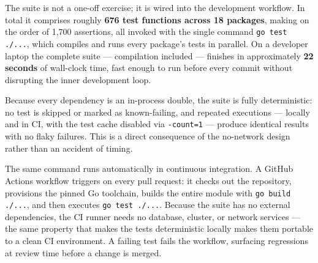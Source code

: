 The suite is not a one-off exercise; it is wired into the development workflow. In total it comprises roughly \textbf{676 test functions across 18 packages}, making on the order of 1{,}700 assertions, all invoked with the single command \texttt{go test ./...}, which compiles and runs every package's tests in parallel. On a developer laptop the complete suite --- compilation included --- finishes in approximately \textbf{22 seconds} of wall-clock time, fast enough to run before every commit without disrupting the inner development loop.

Because every dependency is an in-process double, the suite is fully deterministic: no test is skipped or marked as known-failing, and repeated executions --- locally and in CI, with the test cache disabled via \texttt{-count=1} --- produce identical results with no flaky failures. This is a direct consequence of the no-network design rather than an accident of timing.

The same command runs automatically in continuous integration. A GitHub Actions workflow triggers on every pull request: it checks out the repository, provisions the pinned Go toolchain, builds the entire module with \texttt{go build ./...}, and then executes \texttt{go test ./...}. Because the suite has no external dependencies, the CI runner needs no database, cluster, or network services --- the same property that makes the tests deterministic locally makes them portable to a clean CI environment. A failing test fails the workflow, surfacing regressions at review time before a change is merged.
